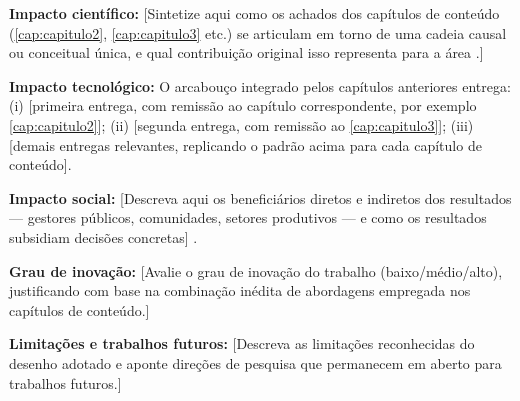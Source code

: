 %
%

\textbf{Impacto científico:} [Sintetize aqui como os achados dos
capítulos de conteúdo (\autoref{cap:capitulo2}, \autoref{cap:capitulo3}
etc.) se articulam em torno de uma cadeia causal ou conceitual única,
e qual contribuição original isso representa para a área
\cite{exemplo:artigo:2024,exemplo:capitulo:2019}.]

\textbf{Impacto tecnológico:} O arcabouço integrado pelos capítulos
anteriores entrega: (i) [primeira entrega, com remissão ao capítulo
correspondente, por exemplo \autoref{cap:capitulo2}]; (ii) [segunda
entrega, com remissão ao \autoref{cap:capitulo3}]; (iii) [demais
entregas relevantes, replicando o padrão acima para cada capítulo de
conteúdo].

\textbf{Impacto social:} [Descreva aqui os beneficiários diretos e
indiretos dos resultados — gestores públicos, comunidades, setores
produtivos — e como os resultados subsidiam decisões concretas]
\cite{brasil:lei:2012}.

\textbf{Grau de inovação:} [Avalie o grau de inovação do trabalho
(baixo/médio/alto), justificando com base na combinação inédita de
abordagens empregada nos capítulos de conteúdo.]

\textbf{Limitações e trabalhos futuros:} [Descreva as limitações
reconhecidas do desenho adotado e aponte direções de pesquisa que
permanecem em aberto para trabalhos futuros.]
